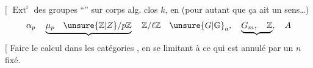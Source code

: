 \noindent$\bigl[$  $\operatorname{Ext}^i$ des groupes ``'' sur corps alg. clos $k$, en  (pour autant que ça ait un sens\ldots)
\[
\alpha_p\quad\underbrace{\mu_p\quad\unsure{\mathbb Z|Z}/p\mathbb Z}\quad\mathbb Z/\ell\mathbb Z\quad\unsure{G|\mathbb G}_a,\quad\underbrace{G_m,\quad\mathbb Z},\quad A
\]
\noindent$\bigl[$ Faire le calcul dans les catégories , en se limitant à ce qui est annulé par un $n$ fixé.
